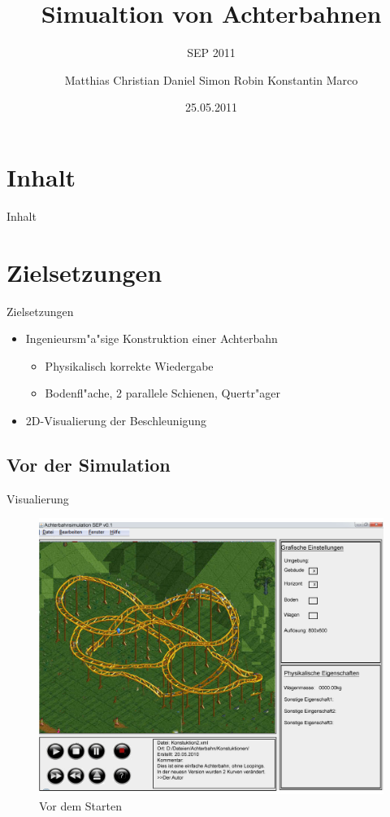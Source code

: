 \documentclass{beamer}%
\title[SEP 2011]{Simualtion von Achterbahnen}
\subtitle{SEP 2011}
\author{\tiny{Matthias Christian Daniel Simon  Robin Konstantin Marco}}
\institute[TU-BS]{Technische Universit"at Carolo-Wilhelmina zu Braunschweig}
\date{25.05.2011}
\begin{document}
	\begin{frame}
		\titlepage
	\end{frame}
	
	\section*{Inhalt}
	\begin{frame}{Inhalt}
		\tableofcontents
	\end{frame}
	
	\section{Zielsetzungen}
	\begin{frame}{Zielsetzungen}
	\begin{itemize}
	\item Ingenieursm"a"sige Konstruktion einer Achterbahn
		\begin{itemize}
			\item Physikalisch korrekte Wiedergabe
			\item Bodenfl"ache, 2 parallele Schienen, Quertr"ager
		\end{itemize}
		\item 2D-Visualierung der Beschleunigung
	\end{itemize}

	\end{frame}
	
	

	
	\subsection{Vor der Simulation}
	\begin{frame}{Visualierung}
		\begin{figure}
			\includegraphics[width=0.75\linewidth]{GUI_v3.jpg}
			\caption{Vor dem Starten}
		\end{figure}
	\end{frame}
	
\end{document}
